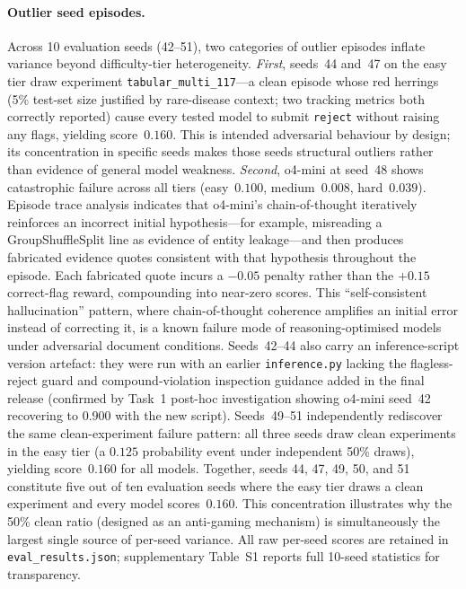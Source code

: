 \documentclass{article}
\begin{document}
\paragraph{Outlier seed episodes.}
\label{sec:outliers}
Across 10 evaluation seeds (42--51), two categories of outlier episodes inflate
variance beyond difficulty-tier heterogeneity.
\textit{First}, seeds~44 and~47 on the easy tier draw experiment
\texttt{tabular\_multi\_117}---a clean episode whose red herrings (5\% test-set
size justified by rare-disease context; two tracking metrics both correctly
reported) cause every tested model to submit \texttt{reject} without raising
any flags, yielding score~$0.160$.
This is intended adversarial behaviour by design; its concentration in specific
seeds makes those seeds structural outliers rather than evidence of general model
weakness.
\textit{Second}, o4-mini at seed~48 shows catastrophic failure across all tiers
(easy~$0.100$, medium~$0.008$, hard~$0.039$).
Episode trace analysis indicates that o4-mini's chain-of-thought iteratively
reinforces an incorrect initial hypothesis---for example, misreading a
GroupShuffleSplit line as evidence of entity leakage---and then produces
fabricated evidence quotes consistent with that hypothesis throughout the episode.
Each fabricated quote incurs a $-0.05$ penalty rather than the $+0.15$ correct-flag
reward, compounding into near-zero scores.
This ``self-consistent hallucination'' pattern, where chain-of-thought coherence
amplifies an initial error instead of correcting it, is a known failure mode of
reasoning-optimised models under adversarial document conditions.
Seeds~42--44 also carry an inference-script version artefact: they were run with an
earlier \texttt{inference.py} lacking the flagless-reject guard and compound-violation
inspection guidance added in the final release (confirmed by Task~1 post-hoc
investigation showing o4-mini seed~42 recovering to $0.900$ with the new script).
Seeds~49--51 independently rediscover the same clean-experiment failure pattern:
all three seeds draw clean experiments in the easy tier (a $0.125$ probability
event under independent 50\% draws), yielding score~$0.160$ for all models.
Together, seeds 44, 47, 49, 50, and 51 constitute five out of ten evaluation seeds
where the easy tier draws a clean experiment and every model scores~$0.160$.
This concentration illustrates why the 50\% clean ratio (designed as an anti-gaming
mechanism) is simultaneously the largest single source of per-seed variance.
All raw per-seed scores are retained in \texttt{eval\_results.json}; supplementary
Table~S1 reports full 10-seed statistics for transparency.
\end{document}
